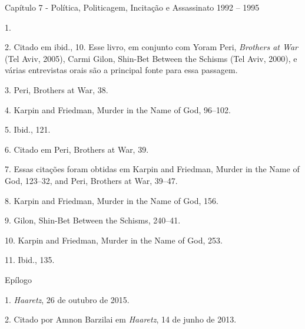 

Capítulo 7 - Política, Politicagem, Incitação e Assassinato 1992 -- 1995

1. 

2. Citado em ibid., 10. Esse livro, em conjunto com Yoram Peri, \textit{Brothers
at War} (Tel Aviv, 2005), Carmi Gilon, Shin-Bet Between the Schisms (Tel
Aviv, 2000), e várias entrevistas orais são a principal fonte para essa
passagem.

3. Peri, Brothers at War, 38.

4. Karpin and Friedman, Murder in the Name of God, 96--102.

5. Ibid., 121.

6. Citado em Peri, Brothers at War, 39.

7. Essas citações foram obtidas em Karpin and Friedman, Murder in the
Name of God, 123--32, and Peri, Brothers at War, 39--47.

8. Karpin and Friedman, Murder in the Name of God, 156.

9. Gilon, Shin-Bet Between the Schisms, 240--41.

10. Karpin and Friedman, Murder in the Name of God, 253.

11. Ibid., 135.

Epílogo

1. \textit{Haaretz}, 26 de outubro de 2015.

2. Citado por Amnon Barzilai em \textit{Haaretz}, 14 de junho de 2013.


